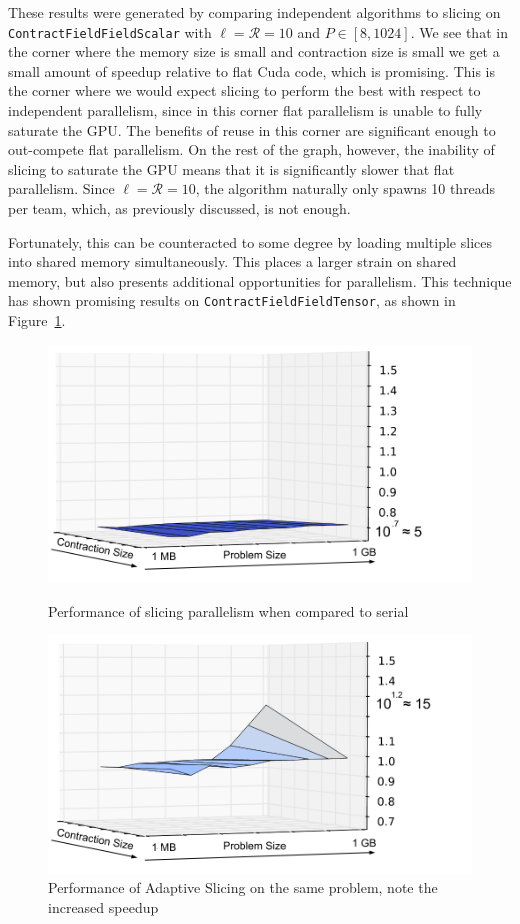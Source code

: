 These results were generated by comparing independent algorithms to slicing on
\texttt{ContractFieldFieldScalar} with $\ell = \mathcal{R} = 10$ and $P \in [8,1024]$. We see
that in the corner where the memory size is small and contraction size is small
we get a small amount of speedup relative to flat Cuda code, which is
promising. This is the corner where we would expect slicing to perform the best
with respect to independent parallelism, since in this corner flat parallelism
is unable to fully saturate the GPU. The benefits of reuse in this corner are
significant enough to out-compete flat parallelism. On the rest of the graph,
however, the inability of slicing to saturate the GPU means that it is
significantly slower that flat parallelism. Since $\ell = \mathcal{R} = 10$,
the algorithm naturally only spawns 10 threads per team, which, as previously discussed, is not enough. 

Fortunately, this can be counteracted to some degree by loading multiple slices 
into shared memory simultaneously. This places a larger strain on shared memory, 
but also presents additional opportunities for parallelism. 
This technique has shown promising results on \texttt{ContractFieldFieldTensor}, as shown in Figure~\ref{fig:TwoSlicings}. 

\begin{figure}[H]
    \centering
    \includegraphics[scale = .4]{CFFTSlicingVSSerial}
    \caption{Performance of slicing parallelism when compared to serial}

    \includegraphics[scale = .4]{CFFTAdaptiveSlicingVSSerial}
    \caption[Performance of adaptive slicing]{Performance of Adaptive Slicing on
    the same problem, note the increased speedup}
\label{fig:TwoSlicings}
\end{figure}

